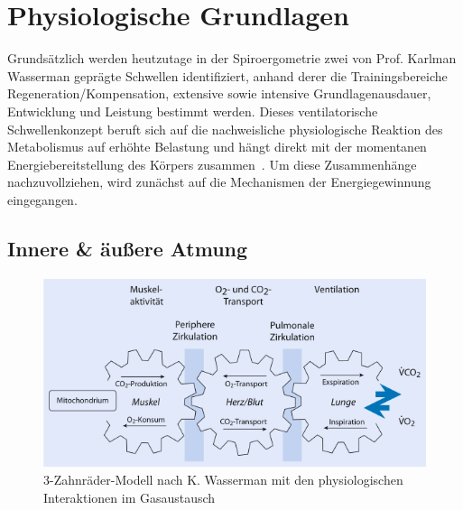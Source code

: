 \section{Physiologische Grundlagen}

Grundsätzlich werden heutzutage in der Spiroergometrie zwei von Prof. Karlman Wasserman geprägte Schwellen identifiziert, anhand derer die Trainingsbereiche Regeneration/Kompensation, extensive sowie intensive Grundlagenausdauer, Entwicklung und Leistung bestimmt werden. Dieses ventilatorische Schwellenkonzept beruft sich auf die nachweisliche physiologische Reaktion des Metabolismus auf erhöhte Belastung und hängt direkt mit der momentanen Energiebereitstellung des Körpers zusammen~\cite{Westhoff.2012}. Um diese Zusammenhänge nachzuvollziehen, wird zunächst auf die Mechanismen der Energiegewinnung eingegangen.

\subsection{Innere \& äußere Atmung}

\begin{figure}[H]
	\centering
	\includegraphics[scale=0.65]{Bilder/zahnraeder.png}
	\caption[3-Zahnräder-Modell mit physiologischen Interaktionen im Gasaustausch]{3-Zahnräder-Modell nach K. Wasserman mit den physiologischen Interaktionen im Gasaustausch~\cite{Loellgen.2010}}
	\label{pic:pic1}
\end{figure}


